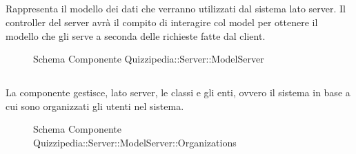 \subsection{}
Rappresenta il modello dei dati che verranno utilizzati dal sistema lato server. 
Il controller del server avrà il compito di interagire col model per ottenere il modello che gli serve a seconda delle richieste fatte dal client.
\begin{figure}[H]
\centering
\noindent{}
\caption[Schema Componente Quizzipedia::Server::ModelServer]{Schema Componente Quizzipedia::Server::ModelServer}
\end{figure}
\subsection{}
La componente gestisce, lato server, le classi e gli enti, ovvero il sistema in base a cui sono organizzati gli utenti nel sistema.
\begin{figure}[H]
\centering
\noindent{}
\caption[Schema Componente Quizzipedia::Server::ModelServer::Organizations]{Schema Componente Quizzipedia::Server::ModelServer::Organizations}
\end{figure}

